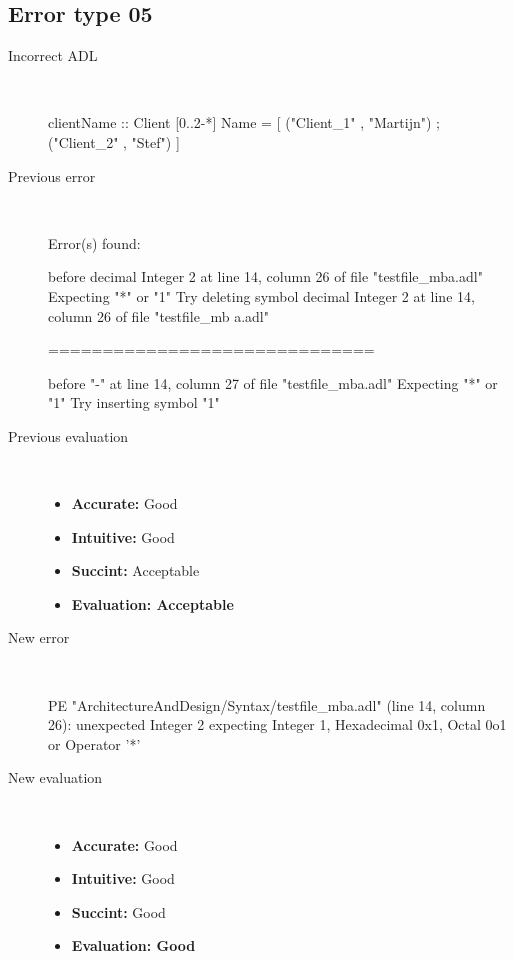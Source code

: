\subsection{Error type 05}
  \begin{description}
  \item[Incorrect ADL]~\\
\begin{adl}
clientName :: Client [0..2-*] Name =
    [ ("Client_1"      , "Martijn")
    ; ("Client_2"      , "Stef")
    ]\end{adl}
  \item[Previous error]~\\
\begin{haskell}
Error(s) found:

before decimal Integer 2 at line 14, column 26 of file "testfile_mba.adl"
Expecting "*" or "1"
Try deleting symbol decimal Integer 2 at line 14, column 26 of file "testfile_mb
a.adl"

==============================

before "-" at line 14, column 27 of file "testfile_mba.adl"
Expecting "*" or "1"
Try inserting symbol "1"\end{haskell}
  \item[Previous evaluation]~\\
    \begin{itemize}
    \item \textbf{Accurate:} Good
    \item \textbf{Intuitive:} Good
    \item \textbf{Succint:} Acceptable
    \item \textbf{Evaluation: Acceptable}
    \end{itemize}
  \item[New error]~\\
\begin{haskell}
PE "ArchitectureAndDesign/Syntax/testfile_mba.adl" (line 14, column 26):
unexpected Integer 2
expecting Integer 1, Hexadecimal 0x1, Octal 0o1 or Operator '*'\end{haskell}
  \item[New evaluation]~\\
    \begin{itemize}
    \item \textbf{Accurate:} Good
    \item \textbf{Intuitive:} Good
    \item \textbf{Succint:} Good
    \item \textbf{Evaluation: Good
}
    \end{itemize}
  \end{description}

